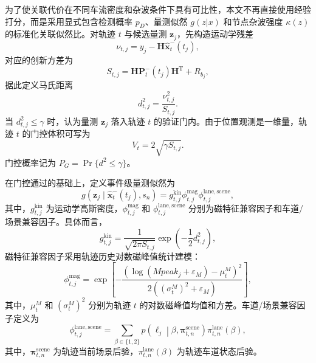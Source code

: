 \documentclass{xdupgthesis}
\begin{document}
为了使关联代价在不同车流密度和杂波条件下具有可比性，本文不再直接使用经验打分，而是采用显式包含检测概率 $p_D$、量测似然 $g(z|x)$ 和节点杂波强度 $\kappa(z)$ 的标准化关联似然比。对轨迹 $t$ 与候选量测 $\mathbf z_j$，先构造运动学残差
\begin{equation}
	\nu_{t,j}=y_j-\mathbf H\hat{\mathbf x}^-_t(t_j),
	\label{eq:ch3_innovation_v2}
\end{equation}
对应的创新方差为
\begin{equation}
	S_{t,j}=\mathbf H\mathbf P^-_t(t_j)\mathbf H^{\mathrm T}+R_{b_j},
	\label{eq:ch3_S_v2}
\end{equation}
据此定义马氏距离
\begin{equation}
	d_{t,j}^2=\frac{\nu_{t,j}^2}{S_{t,j}}.
	\label{eq:ch3_maha_v2}
\end{equation}
当 $d_{t,j}^2\le \gamma$ 时，认为量测 $\mathbf z_j$ 落入轨迹 $t$ 的验证门内。由于位置观测是一维量，轨迹 $t$ 的门控体积可写为
\begin{equation}
	V_t=2\sqrt{\gamma S_{t,j}}.
	\label{eq:ch3_gate_volume}
\end{equation}
门控概率记为 $P_G=\Pr\{d^2\le \gamma\}$。

在门控通过的基础上，定义事件级量测似然为
\begin{equation}
	g(\mathbf z_j\mid \hat{\mathbf x}^-_t(t_j),s_n)
	=
	g_{t,j}^{\mathrm{kin}}
	\phi_{t,j}^{\mathrm{mag}}
	\phi_{t,j}^{\mathrm{lane,scene}},
	\label{eq:ch3_g_total}
\end{equation}
其中，$g_{t,j}^{\mathrm{kin}}$ 为运动学高斯密度，$\phi_{t,j}^{\mathrm{mag}}$ 和 $\phi_{t,j}^{\mathrm{lane,scene}}$ 分别为磁特征兼容因子和车道/场景兼容因子。具体而言，
\begin{equation}
	g_{t,j}^{\mathrm{kin}}
	=
	\frac{1}{\sqrt{2\pi S_{t,j}}}
	\exp\left(-\frac{1}{2}d_{t,j}^2\right),
	\label{eq:ch3_g_kin}
\end{equation}
磁特征兼容因子采用轨迹历史对数磁峰值统计建模：
\begin{equation}
	\phi_{t,j}^{\mathrm{mag}}
	=
	\exp\left[
	-\frac{\left(\log(Mpeak_j+\varepsilon_M)-\mu_{t}^{M}\right)^2}
	{2\left((\sigma_t^{M})^2+\varepsilon_M\right)}
	\right],
	\label{eq:ch3_phi_mag}
\end{equation}
其中，$\mu_t^{M}$ 和 $(\sigma_t^{M})^2$ 分别为轨迹 $t$ 的对数磁峰值均值和方差。车道/场景兼容因子定义为
\begin{equation}
	\phi_{t,j}^{\mathrm{lane,scene}}
	=
	\sum_{\beta\in\{1,2\}}
	p\!\left(\ell_j\middle|\beta,\boldsymbol\pi_{t,n}^{\mathrm{scene}}\right)
	\pi_{t,n}^{\mathrm{lane}}(\beta),
	\label{eq:ch3_phi_lane_scene}
\end{equation}
其中，$\boldsymbol\pi_{t,n}^{\mathrm{scene}}$ 为轨迹当前场景后验，$\pi_{t,n}^{\mathrm{lane}}(\beta)$ 为轨迹车道状态后验。
\end{document}
